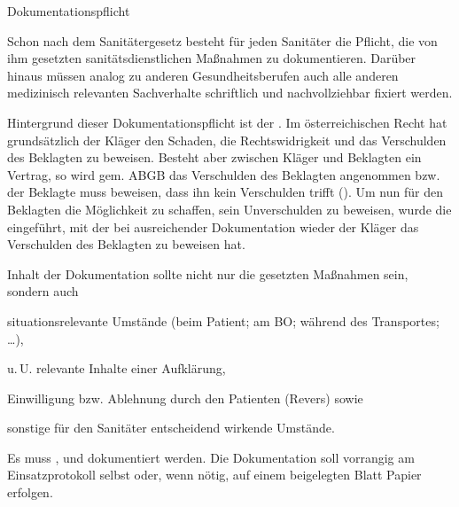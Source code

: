 \Text
{Dokumentationspflicht}
{\label{topic:dokumentationspflicht}%
\label{topic:dokumentation-rechtlich}%
Schon nach dem Sanitätergesetz besteht für jeden Sanitäter
die Pflicht, die von ihm gesetzten
sanitätsdienstlichen Maßnahmen zu
dokumentieren. Darüber hinaus müssen
analog zu anderen Gesundheitsberufen auch alle anderen
medizinisch relevanten Sachverhalte schriftlich und
nachvollziehbar fixiert werden.

Hintergrund dieser Dokumentationspflicht ist der
.
Im österreichischen Recht hat grundsätzlich der Kläger den
Schaden, die Rechtswidrigkeit und das Verschulden des
Beklagten zu beweisen. Besteht aber zwischen Kläger und
Beklagten ein Vertrag, so wird gem.  ABGB das
Verschulden des Beklagten angenommen bzw. der Beklagte muss
beweisen, dass ihn kein Verschulden trifft
().
Um nun für den Beklagten die Möglichkeit zu schaffen, sein
Unverschulden zu beweisen, wurde die
 eingeführt, mit der bei
ausreichender Dokumentation wieder der Kläger das
Verschulden des Beklagten zu beweisen hat.


Inhalt der Dokumentation sollte nicht nur die 
gesetzten Maßnahmen sein, sondern auch 
\begin{compactitem}
  \item situationsrelevante
  Umstände (beim Patient; am BO; während des Transportes;
  {\dots}),
  \item  u.\,U. relevante Inhalte einer Aufklärung,
  \item Einwilligung bzw. Ablehnung durch den Patienten
  (Revers) sowie
  \item sonstige für den Sanitäter entscheidend wirkende
  Umstände.
\end{compactitem}





Es muss ,  und
 dokumentiert werden.
Die Dokumentation soll vorrangig am Einsatzprotokoll selbst
oder, wenn nötig, auf einem beigelegten
Blatt Papier erfolgen.





}
{}
{}
{}
{}

